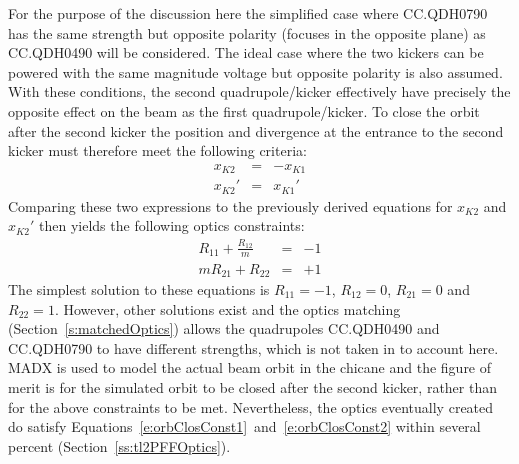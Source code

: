 For the purpose of the discussion here the simplified case where CC.QDH0790 has the same strength but opposite polarity (focuses in the opposite plane) as CC.QDH0490 will be considered. The ideal case where the two kickers can be powered with the same magnitude voltage but opposite polarity is also assumed. With these conditions, the second quadrupole/kicker effectively have precisely the opposite effect on the beam as the first quadrupole/kicker. To close the orbit after the second kicker the position and divergence at the entrance to the second kicker must therefore meet the following criteria:
\begin{eqnarray}
x_{K2} &=& -x_{K1} \\
x_{K2}' &=& x_{K1}'
\end{eqnarray}
Comparing these two expressions to the previously derived equations for \(x_{K2}\) and \(x_{K2}'\) then yields the following optics constraints:
\begin{eqnarray}
R_{11} + \frac{R_{12}}{m} &=& -1  \label{e:orbClosConst1} \\
m R_{21} + R_{22} &=& +1 \label{e:orbClosConst2}
\end{eqnarray}
The simplest solution to these equations is \(R_{11} = -1\), \(R_{12} = 0\), \(R_{21} = 0\) and \(R_{22} = 1\). However, other solutions exist and the optics matching (Section~\ref{s:matchedOptics}) allows the quadrupoles CC.QDH0490 and CC.QDH0790 to have different strengths, which is not taken in to account here. MADX is used to model the actual beam orbit in the chicane and the figure of merit is for the simulated orbit to be closed after the second kicker, rather than for the above constraints to be met. Nevertheless, the optics eventually created do satisfy Equations~\ref{e:orbClosConst1}~and~\ref{e:orbClosConst2} within several percent (Section~\ref{ss:tl2PFFOptics}).


